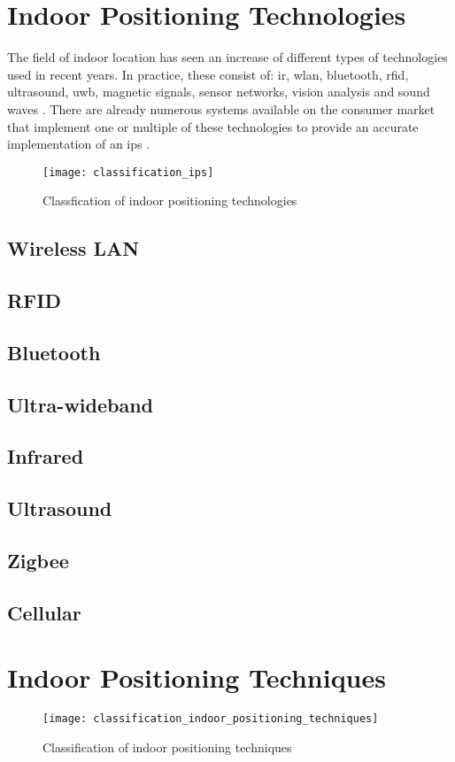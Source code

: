 \section{Indoor Positioning Technologies}
The field of indoor location has seen an increase of different types of technologies used in recent years. In practice, these consist of: \acrfull{ir}, \acrfull{wlan}, bluetooth, \acrfull{rfid}, ultrasound, \acrfull{uwb}, magnetic signals, sensor networks, vision analysis and sound waves \cite{Gu2009}. There are already numerous systems available on the consumer market that implement one or multiple of these technologies to provide an accurate implementation of an \acrshort{ips} \cite{KristianJorstad2016}.
\begin{figure}[h!]
\centering
\texttt{[image: classification\_ips]}
\caption{Classfication of indoor positioning technologies~\cite{ComparativeSurvey}}
\label{fig:ips_classification}
\end{figure}
\subsection{Wireless LAN}
\subsection{RFID}
\subsection{Bluetooth}
\subsection{Ultra-wideband}
\subsection{Infrared}
\subsection{Ultrasound}
\subsection{Zigbee}
\subsection{Cellular}
\section{Indoor Positioning Techniques}
\begin{figure}[h!]
\centering
\texttt{[image: classification\_indoor\_positioning\_techniques]}
\caption{Classification of indoor positioning techniques~\cite{Sakpere2017}}
\label{fig:ips_techniques}
\end{figure}
